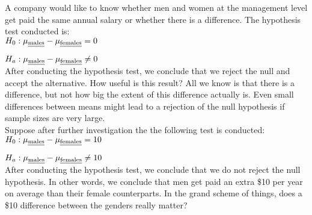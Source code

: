 \begin{example}
A company would like to know whether men and women at the management level
get paid the same annual salary or whether there is a difference.
The hypothesis test conducted is:\\

	\quad	$H_{0}:\mu_{\text{\em males}} - \mu_{\text{\em females}} = 0$
	
	\quad	$H_{a}:\mu_{\text{\em males}} - \mu_{\text{\em females}} \neq 0$	\\

After conducting the hypothesis test, we conclude that we reject the null and accept the alternative. How useful is this result? All we know is that there is a difference, but not how big the extent of this difference actually is. Even small differences between means might lead to a rejection of the null hypothesis if sample sizes are very large.\\

Suppose after further investigation the the following test is conducted:\\

	\quad	$H_{0}:\mu_{\text{\em males}} - \mu_{\text{\em females}} = 10$
	
	\quad	$H_{a}:\mu_{\text{\em males}} - \mu_{\text{\em females}} \neq 10$	\\

After conducting the hypothesis test, we conclude that we do not reject the null hypothesis. In other words, we conclude that men get paid an extra \$10 per year on average than their female counterparts.
In the grand scheme of things, does a \$10 difference between the genders really matter?


\end{example}








